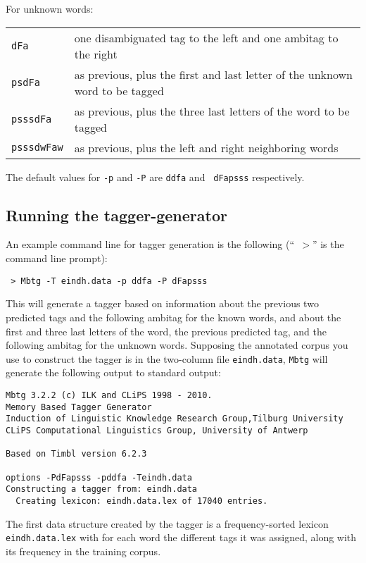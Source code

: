 \documentclass{report}
\begin{document}
For unknown words:

\begin{tabular}{ll}
{\tt dFa} & one disambiguated tag to the left and one ambitag to the right \\
{\tt psdFa} & as previous, plus the first and last letter of the unknown word to be tagged \\ 
{\tt psssdFa} & as previous, plus the three last letters of the word to be tagged \\
{\tt psssdwFaw} & as previous, plus the left and right neighboring words \\
\end{tabular}

The default values for {\tt -p} and {\tt -P} are {\tt ddfa} and {\tt
  dFapsss} respectively. 

\subsection{Running the tagger-generator}

An example command line for tagger generation is the following (``{\tt
$>$}'' is the command line prompt):

{\small
\begin{verbatim}
 > Mbtg -T eindh.data -p ddfa -P dFapsss
\end{verbatim}
}

This will generate a tagger based on information about the previous
two predicted tags and the following ambitag for the known words, and
about the first and three last letters of the word, the previous predicted
tag, and the following ambitag for the unknown words. Supposing the
annotated corpus you use to construct the tagger is in the two-column
file {\tt eindh.data}, {\tt Mbtg} will generate the following output
to standard output:

{\small
\begin{verbatim}
Mbtg 3.2.2 (c) ILK and CLiPS 1998 - 2010.
Memory Based Tagger Generator
Induction of Linguistic Knowledge Research Group,Tilburg University
CLiPS Computational Linguistics Group, University of Antwerp

Based on Timbl version 6.2.3

options -PdFapsss -pddfa -Teindh.data 
Constructing a tagger from: eindh.data
  Creating lexicon: eindh.data.lex of 17040 entries.
\end{verbatim}
}

The first data structure created by the tagger is a frequency-sorted
lexicon {\tt eindh.data.lex} with for each word the different tags it
was assigned, along with its frequency in the training corpus. 
\end{document}
